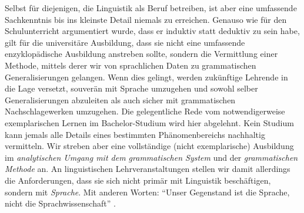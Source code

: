Selbst für diejenigen, die Linguistik als Beruf betreiben, ist aber eine umfassende Sachkenntnis bis ins kleinste Detail niemals zu erreichen.
Genauso wie für den Schulunterricht argumentiert wurde, dass er induktiv statt deduktiv zu sein habe, gilt für die universitäre Ausbildung, dass sie nicht eine umfassende enzyklopädische Ausbildung anstreben sollte, sondern die Vermittlung einer Methode, mittels derer wir von sprachlichen Daten zu grammatischen Generalisierungen gelangen.
Wenn dies gelingt, werden zukünftige Lehrende in die Lage versetzt, souverän mit Sprache umzugehen und sowohl selber Generalisierungen abzuleiten als auch sicher mit grammatischen Nachschlagewerken umzugehen.
Die gelegentliche Rede vom notwendigerweise exemplarischen Lernen im Bachelor-Studium wird hier abgelehnt.
Kein Studium kann jemals alle Details eines bestimmten Phänomenbereichs nachhaltig vermitteln.
Wir streben aber eine vollständige (nicht exemplarische) Ausbildung im \textit{analytischen Umgang mit dem grammatischen System} und der \textit{grammatischen Methode} an.
An linguistischen Lehrveranstaltungen stellen wir damit allerdings die Anforderungen, dass sie sich nicht primär mit Linguistik beschäftigen, sondern mit \textit{Sprache}.
Mit anderen Worten:
"`Unser Gegenstand ist die Sprache, nicht die Sprachwissenschaft"' \citep[22]{Eisenberg2004}.

\Enl[-2]

